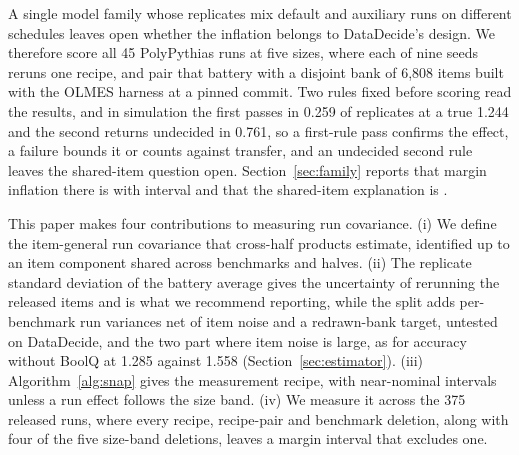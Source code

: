 A single model family whose replicates mix default and auxiliary runs on different schedules leaves open whether the inflation belongs to DataDecide's design. We therefore score all 45 PolyPythias runs at five sizes, where each of nine seeds reruns one recipe, and pair that battery with a disjoint bank of 6,808 items built with the OLMES harness \citep{gu2025olmes} at a pinned commit. Two rules fixed before scoring read the results, and in simulation the first passes in 0.259 of replicates at a true 1.244 and the second returns undecided in 0.761, so a first-rule pass confirms the effect, a failure bounds it or counts against transfer, and an undecided second rule leaves the shared-item question open. Section~\ref{sec:family} reports that margin inflation there is  with interval  and that the shared-item explanation is .

This paper makes four contributions to measuring run covariance. (i) We define the item-general run covariance that cross-half products estimate, identified up to an item component shared across benchmarks and halves. (ii) The replicate standard deviation of the battery average gives the uncertainty of rerunning the released items and is what we recommend reporting, while the split adds per-benchmark run variances net of item noise and a redrawn-bank target, untested on DataDecide, and the two part where item noise is large, as for accuracy without BoolQ at 1.285 against 1.558 (Section~\ref{sec:estimator}). (iii) Algorithm~\ref{alg:snap} gives the measurement recipe, with near-nominal intervals unless a run effect follows the size band. (iv) We measure it across the 375 released runs, where every recipe, recipe-pair and benchmark deletion, along with four of the five size-band deletions, leaves a margin interval that excludes one.
